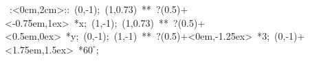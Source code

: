 \hbox{
\xy    <2cm,0cm>:<0cm,2cm>::
       (0,-1); (1,0.73) **\dir{-}  ?(0.5)+<-0.75em,1ex> *{x};
       (1,-1); (1,0.73) **\dir{-}  ?(0.5)+<0.5em,0ex> *{y};
       (0,-1); (1,-1) **\dir{-}    ?(0.5)+<0em,-1.25ex> *{3};
	   (0,-1)+<1.75em,1.5ex> *{\hbox{$60^{\circ}$}};
       \endxy}
